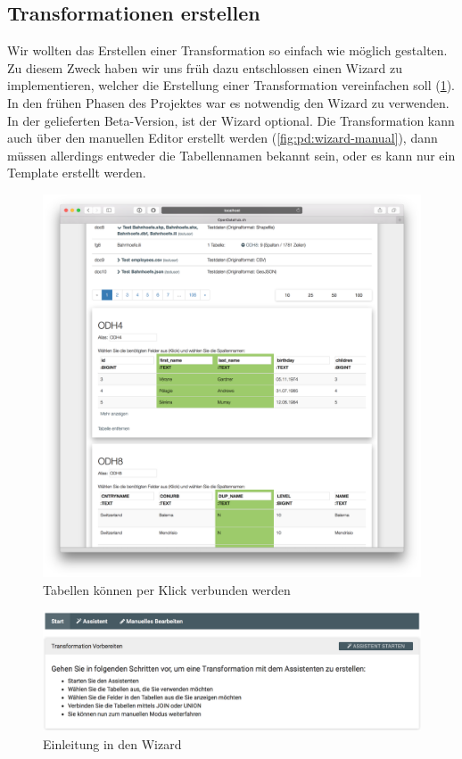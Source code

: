 \subsection{Transformationen erstellen}
Wir wollten das Erstellen einer Transformation so einfach wie möglich gestalten. Zu diesem Zweck haben wir uns früh dazu entschlossen einen Wizard zu implementieren, welcher die Erstellung einer Transformation vereinfachen soll (\cref{fig:pd:tables_per_click}). In den frühen Phasen des Projektes war es notwendig den Wizard zu verwenden. In der gelieferten Beta-Version, ist der Wizard optional. Die Transformation kann auch über den manuellen Editor erstellt werden (\cref{fig:pd:wizard-manual}), dann müssen allerdings entweder die Tabellennamen bekannt sein, oder es kann nur ein Template erstellt werden.
\begin{figure}[H]
\centering
\includegraphics[width=\linewidth]{fig/odhql_wizard_early.png}
\caption{Tabellen können per Klick verbunden werden }
\label{fig:pd:tables_per_click}
\end{figure}
\begin{figure}[H]
\centering
\includegraphics[width=\linewidth]{fig/wizard-step-one.png}
\caption{Einleitung in den Wizard}
\label{fig:pd:wizard-step-one}
\end{figure}

